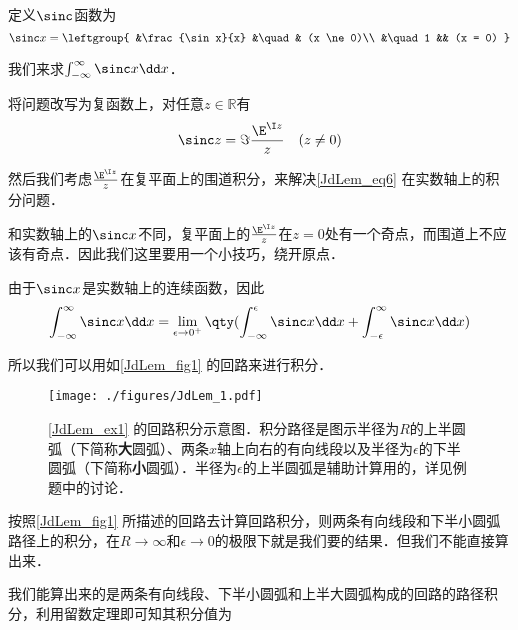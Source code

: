 \begin{example}{}\label{JdLem_ex1}

定义$\sinc$函数为
\begin{equation}
\sinc x = 
\leftgroup{
&\frac{\sin x}{x} &\quad & (x \ne 0)\\
&\quad 1 && (x = 0)
}\end{equation}

我们来求$\int_{-\infty}^{\infty}\sinc x\dd x$．

将问题改写为复函数上，对任意$z\in\mathbb{R}$有
\begin{equation}\label{JdLem_eq6}
\sinc z = \Im \frac{\E^{\I z}}{z} \quad  (z \ne 0)
\end{equation}

然后我们考虑$\frac{\E^{\I z}}{z}$在复平面上的围道积分，来解决\autoref{JdLem_eq6} 在实数轴上的积分问题．

和实数轴上的$\sinc x$不同，复平面上的$\frac{\E^{\I z}}{z}$在$z=0$处有一个奇点，而围道上不应该有奇点．因此我们这里要用一个小技巧，绕开原点．

由于$\sinc x$是实数轴上的连续函数，因此
\begin{equation}
\int_{-\infty}^\infty \sinc x \dd x=\lim\limits_{\epsilon\to 0^+}\qty(\int_{-\infty}^\epsilon \sinc x \dd x+\int_{-\epsilon}^\infty \sinc x \dd x)
\end{equation}

所以我们可以用如\autoref{JdLem_fig1} 的回路来进行积分．

\begin{figure}[ht]
\centering
\texttt{[image: ./figures/JdLem\_1.pdf]}
\caption{\autoref{JdLem_ex1} 的回路积分示意图．积分路径是图示半径为$R$的上半圆弧（下简称\textbf{大}圆弧）、两条$x$轴上向右的有向线段以及半径为$\epsilon$的下半圆弧（下简称\textbf{小}圆弧）．半径为$\epsilon$的上半圆弧是辅助计算用的，详见例题中的讨论．} \label{JdLem_fig1}
\end{figure}

按照\autoref{JdLem_fig1} 所描述的回路去计算回路积分，则两条有向线段和下半小圆弧路径上的积分，在$R\to\infty$和$\epsilon\to 0$的极限下就是我们要的结果．但我们不能直接算出来．

我们能算出来的是两条有向线段、下半小圆弧和上半大圆弧构成的回路的路径积分，利用留数定理即可知其积分值为



\end{example}





























